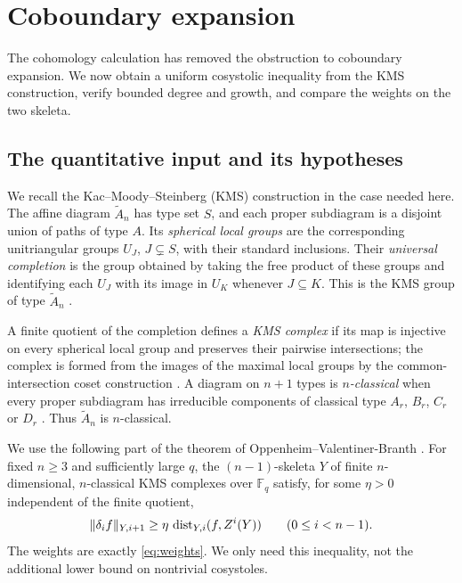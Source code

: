 \section{Coboundary expansion}
\label{sec:expansion}

The cohomology calculation has removed the obstruction to coboundary
expansion. We now obtain a uniform cosystolic inequality from the KMS
construction, verify bounded degree and growth, and compare the weights
on the two skeleta.

\subsection{The quantitative input and its hypotheses}

We recall the Kac--Moody--Steinberg (KMS) construction in the case needed
here. The affine diagram $\widetilde A_n$ has type set $S$, and each
proper subdiagram is a disjoint union of paths of type $A$. Its
\emph{spherical local groups} are the corresponding unitriangular groups
$U_J$, $J\subsetneq S$, with their standard inclusions.
Their \emph{universal completion} is the group obtained by taking the
free product of these groups and identifying each $U_J$ with its image
in $U_K$ whenever $J\subseteq K$. This is the KMS group of type
$\widetilde A_n$ \cite[Definition~4.6]{OVB}.

A finite quotient of the completion defines a \emph{KMS complex} if
its map is injective on every spherical local group and preserves their
pairwise intersections; the complex is formed from the images of the
maximal local groups by the common-intersection coset construction
\cite[Definitions~4.8 and~4.11]{OVB}. A diagram on $n+1$ types is
\emph{$n$-classical} when every proper subdiagram has irreducible
components of classical type $A_r$, $B_r$, $C_r$ or $D_r$
\cite[Definition~4.2]{OVB}. Thus $\widetilde A_n$ is $n$-classical.

We use the following part of the theorem of Oppenheim--Valentiner-Branth
\cite[Theorem~1.2]{OVB}. For fixed $n\ge3$ and sufficiently large $q$,
the $(n-1)$-skeleta $Y$ of finite $n$-dimensional, $n$-classical KMS
complexes over $\mathbb F_q$ satisfy, for some $\eta>0$ independent of
the finite quotient,
\begin{equation}\label{eq:cosystolic}
 \lVert\delta_i f\rVert_{Y,i+1}
 \ge\eta\,\operatorname{dist}_{Y,i}(f,Z^i(Y))
 \qquad(0\le i<n-1).
\end{equation}
The weights are exactly \eqref{eq:weights}. We only need this inequality,
not the additional lower bound on nontrivial cosystoles.

